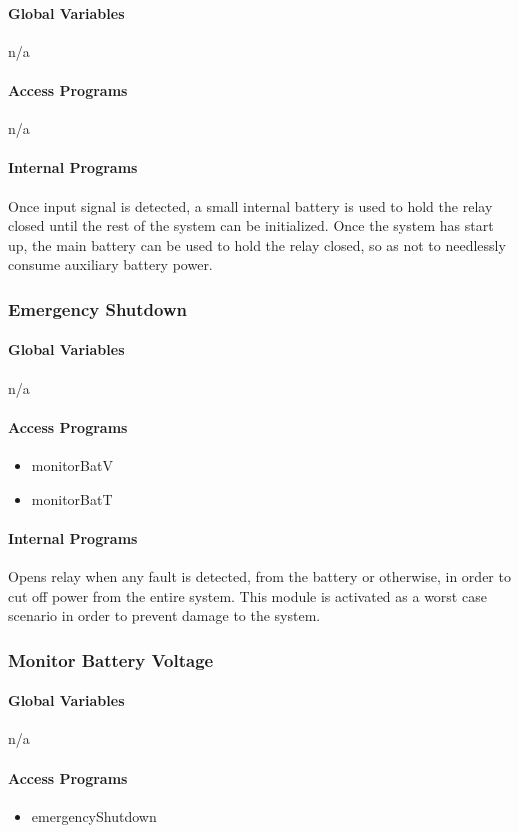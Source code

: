 \documentclass[10pt,letterpaper]{article}
\begin{document}
\paragraph{Global Variables}
n/a
\paragraph{Access Programs}
n/a
\paragraph{Internal Programs}
Once input signal is detected, a small internal battery is used to hold the relay closed until the rest of the system can be initialized. Once the system has start up, the main battery can be used to hold the relay closed, so as not to needlessly consume auxiliary battery power.

\subsubsection{Emergency Shutdown}
\paragraph{Global Variables}
n/a
\paragraph{Access Programs}
\begin{itemize}
\item monitorBatV
\item monitorBatT
\end{itemize}
\paragraph{Internal Programs}
Opens relay when any fault is detected, from the battery or otherwise, in order to cut off power from the entire system. This module is activated as a worst case scenario in order to prevent damage to the system.

\subsubsection{Monitor Battery Voltage}
\paragraph{Global Variables}
n/a
\paragraph{Access Programs}
\begin{itemize}
\item emergencyShutdown
\end{itemize}
\end{document}
